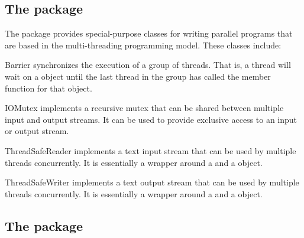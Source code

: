 \documentclass[a4paper,10pt]{article}
\begin{document}
\subsection{The  package}

The  package provides special-purpose classes for writing
parallel programs that are based in the multi-threading programming
model. These classes include:
\begin{Description}[\Code]

\item[Barrier] synchronizes the execution of a group of threads. That is,
  a thread will wait on a  object until the last thread in
  the group has called the member function  for that object.

\item[IOMutex] implements a recursive mutex that can be shared between
  multiple input and output streams. It can be used to provide exclusive
  access to an input or output stream.

\item[ThreadSafeReader] implements a text input stream that can be used
  by multiple threads concurrently. It is essentially a wrapper around a
   and a \hyperref[class:Reader]{} object.

\item[ThreadSafeWriter] implements a text output stream that can be used
  by multiple threads concurrently. It is essentially a wrapper around a
   and a \hyperref[class:Writer]{} object.

\end{Description}

\subsection{The  package}
\end{document}
